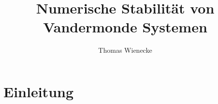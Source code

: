 \documentclass[a4paper, oneside, 11pt]{scrreprt}
\title{Numerische Stabilität von Vandermonde Systemen}
\author{Thomas Wienecke}
\begin{document}
\maketitle
\tableofcontents

\chapter{Einleitung}

%








\end{document}
